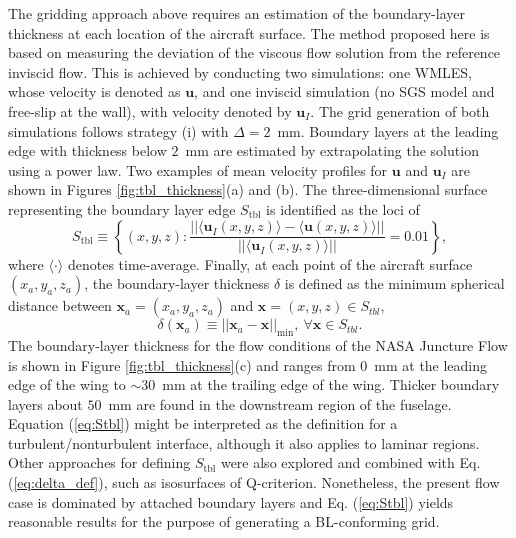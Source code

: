 \documentclass{ctr}
\begin{document}
The gridding approach above requires an estimation of the
boundary-layer thickness at each location of the aircraft surface.
The method proposed here is based on measuring the deviation of the
viscous flow solution from the reference inviscid flow. This is
achieved by conducting two simulations: one WMLES, whose velocity is
denoted as $\boldsymbol{u}$, and one inviscid simulation (no SGS model
and free-slip at the wall), with velocity denoted by
$\boldsymbol{u}_I$. The grid generation of both simulations follows
strategy (i) with $\Delta =2$~mm. Boundary layers at the leading edge
with thickness below $2$~mm are estimated by extrapolating the
solution using a power law.  Two examples of mean velocity profiles
for $\boldsymbol{u}$ and $\boldsymbol{u}_I$ are shown in Figures
\ref{fig:tbl_thickness}(a) and (b). The three-dimensional surface
representing the boundary layer edge $S_\mathrm{tbl}$ is identified as
the loci of
  \begin{equation}\label{eq:Stbl}
    S_\mathrm{tbl} \equiv \left\{ (x,y,z)  : \frac{||\langle \boldsymbol{u}_I(x,y,z) \rangle
      - \langle \boldsymbol{u}(x,y,z) \rangle||}{|| \langle \boldsymbol{u}_I(x,y,z) \rangle||} = 0.01 \right\},
  \end{equation}
where $\langle \cdot \rangle$ denotes time-average. Finally, at each
point of the aircraft surface $(x_a,y_a,z_a)$, the boundary-layer
thickness $\delta$ is defined as the minimum spherical distance
between $\boldsymbol{x}_a = (x_a,y_a,z_a)$ and $\boldsymbol{x} =
(x,y,z) \in S_{tbl}$,
  \begin{equation}\label{eq:delta_def}
    \delta(\boldsymbol{x}_a) \equiv ||\boldsymbol{x}_a - \boldsymbol{x}||_\mathrm{min},
    \ \forall \boldsymbol{x} \in S_{tbl}.
  \end{equation}
The boundary-layer thickness for the flow conditions of the NASA
Juncture Flow is shown in Figure \ref{fig:tbl_thickness}(c) and ranges
from $0$~mm at the leading edge of the wing to $\sim 30$~mm at the
trailing edge of the wing. Thicker boundary layers about $50$~mm are
found in the downstream region of the fuselage. Equation
(\ref{eq:Stbl}) might be interpreted as the definition for a
turbulent/nonturbulent interface, although it also applies to laminar
regions. Other approaches for defining $S_{\mathrm{tbl}}$ were also
explored and combined with Eq. (\ref{eq:delta_def}), such as
isosurfaces of Q-criterion. Nonetheless, the present flow case is
dominated by attached boundary layers and Eq. (\ref{eq:Stbl}) yields
reasonable results for the purpose of generating a BL-conforming grid.
\end{document}
